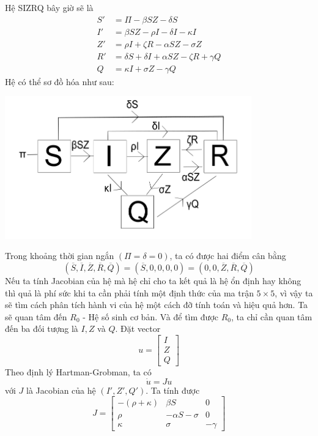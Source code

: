 \documentclass[12pt]{scrartcl}
\begin{document}
Hệ SIZRQ bây giờ sẽ là 
\[
    \begin{aligned}
        S' &= \Pi - \beta SZ - \delta S\\
        I' &= \beta SZ - \rho I - \delta I - \kappa I\\
        Z' &= \rho I + \zeta R - \alpha SZ - \sigma Z \\
        R' &= \delta S + \delta I + \alpha SZ - \zeta R + \gamma Q\\
        Q &= \kappa I + \sigma Z - \gamma Q
    \end{aligned}
\]
Hệ có thể sơ đồ hóa như sau:
\begin{center}
    \includegraphics[width=0.8\textwidth]{SIZRQ.png}
\end{center}
Trong khoảng thời gian ngắn $(\Pi = \delta = 0)$, ta có được hai điểm cân bằng 
\[
(\overline{S},\overline{I},\overline{Z},\overline{R},\overline{Q}) = (\overline{S},0,0,0,0) = (0,0,\overline{Z},\overline{R},\overline{Q})
\]
Nếu ta tính Jacobian của hệ mà hệ chỉ cho ta kết quả là hệ ổn định hay không thì quả là phí sức khi ta cần phải tính một định thức của ma trận $5\times 5$, vì vậy ta sẽ tìm cách phân tích hành vi của hệ một cách đỡ tính toán và hiệu quả hơn. Ta sẽ quan tâm đến $R_0$ - Hệ số sinh cơ bản. Và để tìm được $R_0$, ta chỉ cần quan tâm đến ba đối tượng là $I,Z$ và $Q$. Đặt vector
\[
    u = \begin{bmatrix}
        I\\Z\\Q
    \end{bmatrix}
\]
Theo định lý Hartman-Grobman, ta có 
\[
    \dot{u}  = Ju
\]
với $J$ là Jacobian của hệ $(I',Z',Q')$. Ta tính được 
\[J = 
\begin{bmatrix}
-(\rho+\kappa) & \beta S & 0 \\[6pt]
\rho & -\alpha S - \sigma & 0 \\[6pt]
\kappa & \sigma & -\gamma
\end{bmatrix}
\]
\end{document}
